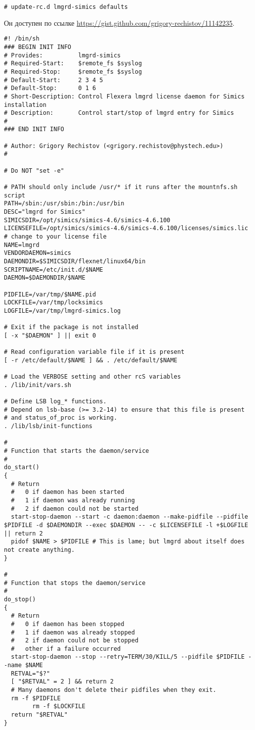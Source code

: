 \texttt{\# update-rc.d lmgrd-simics defaults}

Он доступен по ссылке \url{https://gist.github.com/grigory-rechistov/11142235}.

\begin{lstlisting}
#! /bin/sh
### BEGIN INIT INFO
# Provides:          lmgrd-simics
# Required-Start:    $remote_fs $syslog
# Required-Stop:     $remote_fs $syslog
# Default-Start:     2 3 4 5
# Default-Stop:      0 1 6
# Short-Description: Control Flexera lmgrd license daemon for Simics installation
# Description:       Control start/stop of lmgrd entry for Simics
#
### END INIT INFO

# Author: Grigory Rechistov (<grigory.rechistov@phystech.edu>)
#

# Do NOT "set -e"

# PATH should only include /usr/* if it runs after the mountnfs.sh script
PATH=/sbin:/usr/sbin:/bin:/usr/bin
DESC="lmgrd for Simics"
SIMICSDIR=/opt/simics/simics-4.6/simics-4.6.100
LICENSEFILE=/opt/simics/simics-4.6/simics-4.6.100/licenses/simics.lic # change to your license file
NAME=lmgrd
VENDORDAEMON=simics
DAEMONDIR=$SIMICSDIR/flexnet/linux64/bin
SCRIPTNAME=/etc/init.d/$NAME
DAEMON=$DAEMONDIR/$NAME

PIDFILE=/var/tmp/$NAME.pid
LOCKFILE=/var/tmp/locksimics
LOGFILE=/var/tmp/lmgrd-simics.log

# Exit if the package is not installed
[ -x "$DAEMON" ] || exit 0

# Read configuration variable file if it is present
[ -r /etc/default/$NAME ] && . /etc/default/$NAME

# Load the VERBOSE setting and other rcS variables
. /lib/init/vars.sh

# Define LSB log_* functions.
# Depend on lsb-base (>= 3.2-14) to ensure that this file is present
# and status_of_proc is working.
. /lib/lsb/init-functions

#
# Function that starts the daemon/service
#
do_start()
{
  # Return
  #   0 if daemon has been started
  #   1 if daemon was already running
  #   2 if daemon could not be started
  start-stop-daemon --start -c daemon:daemon --make-pidfile --pidfile $PIDFILE -d $DAEMONDIR --exec $DAEMON -- -c $LICENSEFILE -l +$LOGFILE || return 2
  pidof $NAME > $PIDFILE # This is lame; but lmgrd about itself does not create anything.
}

#
# Function that stops the daemon/service
#
do_stop()
{
  # Return
  #   0 if daemon has been stopped
  #   1 if daemon was already stopped
  #   2 if daemon could not be stopped
  #   other if a failure occurred
  start-stop-daemon --stop --retry=TERM/30/KILL/5 --pidfile $PIDFILE --name $NAME
  RETVAL="$?"
  [ "$RETVAL" = 2 ] && return 2
  # Many daemons don't delete their pidfiles when they exit.
  rm -f $PIDFILE
        rm -f $LOCKFILE
  return "$RETVAL"
}


\end{lstlisting}
